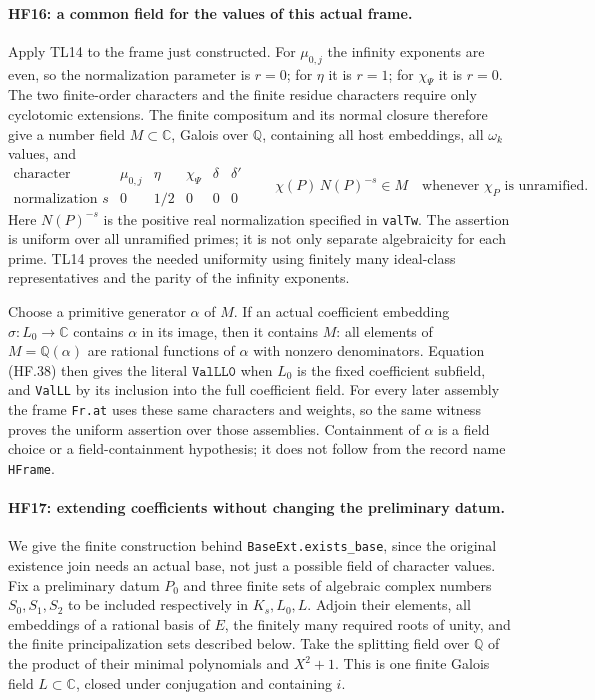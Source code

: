 \paragraph{HF16: a common field for the values of this actual frame.}
Apply TL14 to the frame just constructed. For
$\mu_{0,j}$ the infinity exponents are even, so the
normalization parameter is $r=0$; for $\eta$ it is
$r=1$; for $\chi_\Psi$ it is $r=0$. The two finite-order
characters and the finite residue characters require
only cyclotomic extensions. The finite compositum and
its normal closure therefore give a number field
$M\subset\mathbb C$, Galois over $\mathbb Q$, containing
all host embeddings, all $\omega_k$ values, and
\[
 \begin{array}{c|ccccc}
 \text{character}&\mu_{0,j}&\eta&\chi_\Psi&\delta&\delta'\\ \hline
 \text{normalization }s&0&1/2&0&0&0
 \end{array}
 \qquad
       \chi(P)\,N(P)^{-s}\in M
                    \quad\text{whenever }\chi_P\text{ is unramified}.
 \tag{HF.38}
\]
Here $N(P)^{-s}$ is the positive real normalization
specified in \texttt{valTw}. The assertion is uniform
over all unramified primes; it is not only separate
algebraicity for each prime. TL14 proves the needed
uniformity using finitely many ideal-class representatives
and the parity of the infinity exponents.

Choose a primitive generator $\alpha$ of $M$.
If an actual coefficient embedding $\sigma:L_0\to\mathbb C$
contains $\alpha$ in its image, then it contains $M$:
all elements of $M=\mathbb Q(\alpha)$ are rational
functions of $\alpha$ with nonzero denominators.
Equation (HF.38) then gives the literal
$\texttt{ValLL0}$ when $L_0$ is the fixed coefficient
subfield, and \texttt{ValLL} by its inclusion into the
full coefficient field. For every later assembly the
frame \texttt{Fr.at} uses these same characters and
weights, so the same witness proves the uniform
assertion over those assemblies. Containment of
$\alpha$ is a field choice or a field-containment
hypothesis; it does not follow from the record name
\texttt{HFrame}.

\paragraph{HF17: extending coefficients without changing the preliminary datum.}
We give the finite construction behind
\texttt{BaseExt.exists\_base}, since the original
existence join needs an actual base, not just a possible
field of character values. Fix a preliminary datum
$P_0$ and three finite sets of algebraic complex numbers
$S_0,S_1,S_2$ to be included respectively in $K_s,L_0,L$.
Adjoin their elements, all embeddings of a rational
basis of $E$, the finitely many required roots of
unity, and the finite principalization sets described
below. Take the splitting field over $\mathbb Q$
of the product of their minimal polynomials and
$X^2+1$. This is one finite Galois field $L\subset\mathbb C$,
closed under conjugation and containing $i$.

